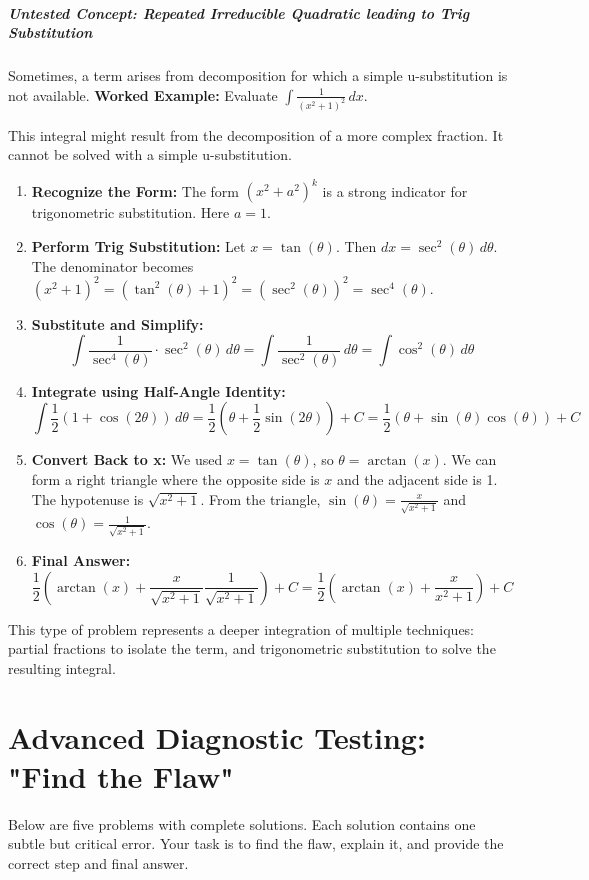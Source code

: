 \documentclass{article}
\begin{document}
\subsubsection*{Untested Concept: Repeated Irreducible Quadratic leading to Trig Substitution}
Sometimes, a term arises from decomposition for which a simple u-substitution is not available.
\textbf{Worked Example:} Evaluate $\displaystyle \int \frac{1}{(x^2+1)^2} \,dx$.

This integral might result from the decomposition of a more complex fraction. It cannot be solved with a simple u-substitution.
\begin{enumerate}
    \item \textbf{Recognize the Form:} The form $(x^2+a^2)^k$ is a strong indicator for trigonometric substitution. Here $a=1$.
    \item \textbf{Perform Trig Substitution:}
    Let $x = \tan(\theta)$. Then $dx = \sec^2(\theta) \,d\theta$.
    The denominator becomes $(x^2+1)^2 = (\tan^2(\theta)+1)^2 = (\sec^2(\theta))^2 = \sec^4(\theta)$.
    \item \textbf{Substitute and Simplify:}
    \[ \int \frac{1}{\sec^4(\theta)} \cdot \sec^2(\theta) \,d\theta = \int \frac{1}{\sec^2(\theta)} \,d\theta = \int \cos^2(\theta) \,d\theta \]
    \item \textbf{Integrate using Half-Angle Identity:}
    \[ \int \frac{1}{2}(1 + \cos(2\theta)) \,d\theta = \frac{1}{2}\left(\theta + \frac{1}{2}\sin(2\theta)\right) + C = \frac{1}{2}(\theta + \sin(\theta)\cos(\theta)) + C \]
    \item \textbf{Convert Back to x:}
    We used $x = \tan(\theta)$, so $\theta = \arctan(x)$. We can form a right triangle where the opposite side is $x$ and the adjacent side is 1. The hypotenuse is $\sqrt{x^2+1}$.
    From the triangle, $\sin(\theta) = \frac{x}{\sqrt{x^2+1}}$ and $\cos(\theta) = \frac{1}{\sqrt{x^2+1}}$.
    \item \textbf{Final Answer:}
    \[ \frac{1}{2}\left(\arctan(x) + \frac{x}{\sqrt{x^2+1}}\frac{1}{\sqrt{x^2+1}}\right) + C = \frac{1}{2}\left(\arctan(x) + \frac{x}{x^2+1}\right) + C \]
\end{enumerate}
This type of problem represents a deeper integration of multiple techniques: partial fractions to isolate the term, and trigonometric substitution to solve the resulting integral.

\part{Advanced Diagnostic Testing: "Find the Flaw"}
Below are five problems with complete solutions. Each solution contains one subtle but critical error. Your task is to find the flaw, explain it, and provide the correct step and final answer.
\end{document}
